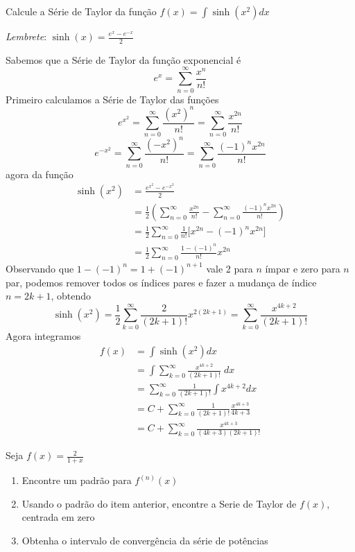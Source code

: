 \documentclass[a4paper,12pt,fleqn]{article}
\begin{document}

Calcule a Série de Taylor da função
\(
  f(x) = \int \sinh\left(x^2\right) dx
\)

\textit{Lembrete}: \(\sinh(x)=\frac{e^x-e^{-x}}{2}\)

\begin{answer}
  Sabemos que a Série de Taylor da função exponencial é
  \[
    e^x = \sum_{n=0}^\infty \frac{x^n}{n!}
  \]
  Primeiro calculamos a Série de Taylor das funções
  \[
    e^{x^2}
    = \sum_{n=0}^\infty \frac{\left(x^2\right)^n}{n!}
    = \sum_{n=0}^\infty \frac{x^{2n}}{n!}
  \]
  \[
    e^{-x^2}
    = \sum_{n=0}^\infty \frac{\left(-x^2\right)^n}{n!}
    = \sum_{n=0}^\infty \frac{(-1)^nx^{2n}}{n!}
  \]
  agora da função
  \begin{align*}
    \sinh\left(x^2\right)
    & = \frac{e^{x^2}-e^{-x^2}}{2} \\[2mm]
    & = \frac{1}{2}\left(
          \sum_{n=0}^\infty \frac{       x^{2n}}{n!} -
          \sum_{n=0}^\infty \frac{(-1)^n x^{2n}}{n!}
        \right) \\[2mm]
    & = \frac{1}{2} \sum_{n=0}^\infty \frac{1}{n!}
                    \big[x^{2n}-(-1)^n x^{2n}\big] \\[2mm]
    & = \frac{1}{2} \sum_{n=0}^\infty \frac{1-(-1)^n}{n!} x^{2n}
  \end{align*}
  Observando que
  \(
    1 - (-1)^n = 1 + (-1)^{n+1}
  \)
  vale 2 para $n$ ímpar e zero para $n$ par,
  podemos remover todos os índices pares e
  fazer a mudança de índice \(n=2k+1\), obtendo
  \[
    \sinh\left(x^2\right)
    = \frac{1}{2} \sum_{k=0}^\infty \frac{2}{(2k+1)!} x^{2(2k+1)}
    = \sum_{k=0}^\infty \frac{x^{4k+2}}{(2k+1)!}
  \]
  Agora integramos
  \begin{align*}
    f(x)
    & = \int \sinh\left(x^2\right) dx \\[2mm]
    & = \int \sum_{k=0}^\infty \frac{x^{4k+2}}{(2k+1)!} \;dx \\[2mm]
    & = \sum_{k=0}^\infty \frac{1}{(2k+1)!} \int x^{4k+2} dx \\[2mm]
    & = C + \sum_{k=0}^\infty \frac{1}{(2k+1)!} \frac{x^{4k+3}}{4k+3} \\[2mm]
    & = C + \sum_{k=0}^\infty \frac{x^{4k+3}}{(4k+3)(2k+1)!}
  \end{align*}
\end{answer}

Seja \( f(x) = \frac{2}{1+x}\)
\begin{enumerate}
  \item[{a) [12]}] Encontre um padrão para \(f^{(n)}(x)\)
  \item[{b) [14]}] Usando o padrão do item anterior, encontre a
                   Serie de Taylor de $f(x)$, centrada em zero
  \item[{c) [14]}] Obtenha o intervalo de convergência da série de potências
\end{enumerate}
\end{document}
